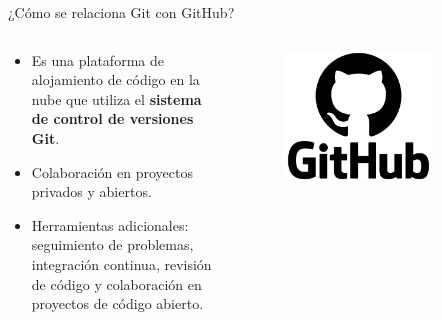 \documentclass{beamer}
\begin{document}
\begin{frame}{¿Cómo se relaciona Git con GitHub?} 


  \begin{columns}
    \begin{column}{.6\textwidth}

      \begin{itemize}

        \item Es una plataforma de alojamiento de código en la nube que utiliza el \textbf{sistema de control de versiones Git}.
        \item Colaboración en proyectos privados y abiertos. 
        \item Herramientas adicionales: seguimiento de problemas, integración continua, revisión de código y colaboración en proyectos de código abierto.
      \end{itemize}
      
    \end{column}

    \begin{column}{.4\textwidth}
      \begin{figure}
        \includegraphics[width=0.8\textwidth]{images/logo_github.png}
      \end{figure}
    \end{column}

  \end{columns}
  

\end{frame}





 
\end{document}
